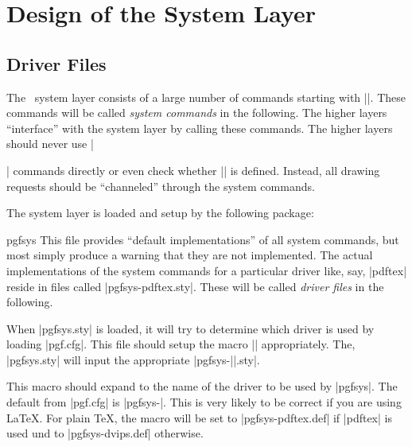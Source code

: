 %

\section{Design of the System Layer}

\makeatletter


\subsection{Driver Files}
\label{section-pgfsys}

The \pgfname\ system layer consists of a large number of commands
starting with |\pgfsys@|. These commands will be called \emph{system
  commands} in the following. The higher layers ``interface'' with the
system layer by calling these commands. The higher layers should never
use |\special| commands directly or even check whether |\pdfoutput| is 
defined. Instead, all drawing requests should be ``channeled'' through
the system commands.

The system layer is loaded and setup by the following package:

\begin{package}{pgfsys}
  This file provides ``default implementations'' of all system
  commands, but most simply produce a warning that they are not
  implemented. The actual implementations of the system commands for a
  particular driver like, say, |pdftex| reside in files called
  |pgfsys-pdftex.sty|. These will be called \emph{driver files} in the
  following.

  When |pgfsys.sty| is loaded, it will try to determine which driver
  is used by loading |pgf.cfg|. This file should setup the macro
  |\pgfsysdriver| appropriately. The, |pgfsys.sty| will input the
  appropriate |pgfsys-||.sty|. 
\end{package}

\begin{command}{\pgfsysdriver}
  This macro should expand to the name of the driver to be used by
  |pgfsys|. The default from |pgf.cfg| is |pgfsys-\Gin@driver|. This
  is very likely to be correct if you are using \LaTeX. For plain
  \TeX, the macro will be set to |pgfsys-pdftex.def| if |pdftex| is
  used und to |pgfsys-dvips.def| otherwise.
\end{command}

